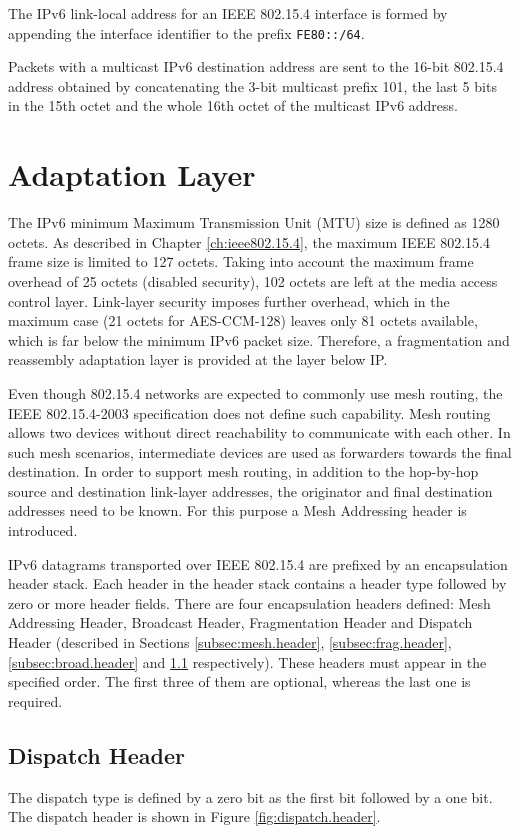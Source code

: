 \documentclass[12pt, titlepage, a4paper]{report}
\begin{document}
The IPv6 link-local address for an IEEE 802.15.4 interface is formed by appending the interface identifier to the prefix \texttt{FE80::/64}.

Packets with a multicast IPv6 destination address are sent to the 16-bit 802.15.4 address obtained by concatenating the 3-bit multicast prefix 101, the last 5 bits in the 15th octet and the whole 16th octet of the multicast IPv6 address.

\section{Adaptation Layer}\label{sec:adapt.layer}
The IPv6 minimum Maximum Transmission Unit (MTU) size is defined as 1280 octets. As described in Chapter \ref{ch:ieee802.15.4}, the maximum IEEE 802.15.4 frame size is limited to 127 octets.  Taking into account the maximum frame overhead of 25 octets (disabled security), 102 octets are left at the media access control layer. Link-layer security imposes further overhead, which in the maximum case (21 octets for AES-CCM-128) leaves only 81 octets available, which is far below the minimum IPv6 packet size. Therefore, a fragmentation and reassembly adaptation layer is provided at the layer below IP.

Even though 802.15.4 networks are expected to commonly use mesh routing, the IEEE 802.15.4-2003 \cite{ieee802.15.4} specification does not define such capability. Mesh routing allows two devices  without direct reachability to communicate with each other. In such mesh scenarios, intermediate devices are used as forwarders towards the final destination. In order to support mesh routing, in addition to the hop-by-hop source and destination link-layer addresses, the originator and final destination addresses need to be known. For this purpose a Mesh Addressing header is introduced.


IPv6 datagrams transported over IEEE 802.15.4 are prefixed by an encapsulation header stack. Each header in the header stack contains a header type followed by zero or more header fields.  There are four encapsulation headers defined: Mesh Addressing Header, Broadcast Header, Fragmentation Header and Dispatch Header (described in Sections \ref{subsec:mesh.header}, \ref{subsec:frag.header},\ref{subsec:broad.header} and \ref{subsec:dispatch.header} respectively). These headers must appear in the specified order. The first three of them are optional, whereas the last one is required.

\subsection{Dispatch Header}\label{subsec:dispatch.header}
The dispatch type is defined by a zero bit as the first bit followed by a one bit. The dispatch header is shown in Figure \ref{fig:dispatch.header}.
\end{document}

